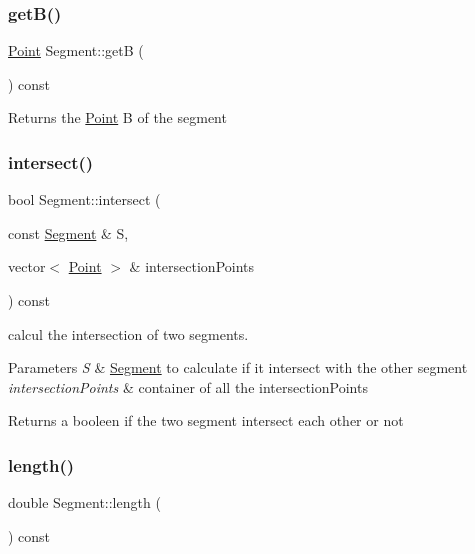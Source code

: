 \subsubsection{\texorpdfstring{get\+B()}{getB()}}
{\footnotesize\ttfamily \hyperlink{class_point}{Point} Segment\+::getB (\begin{DoxyParamCaption}{ }\end{DoxyParamCaption}) const}

\begin{DoxyReturn}{Returns}
the \hyperlink{class_point}{Point} B of the segment 
\end{DoxyReturn}
\hypertarget{class_segment_a379ebf65c2be2ce40d603ed33dae8843}{}\label{class_segment_a379ebf65c2be2ce40d603ed33dae8843} 
\subsubsection{\texorpdfstring{intersect()}{intersect()}}
{\footnotesize\ttfamily bool Segment\+::intersect (\begin{DoxyParamCaption}\item[{const \hyperlink{class_segment}{Segment} \&}]{S,  }\item[{vector$<$ \hyperlink{class_point}{Point} $>$ \&}]{intersection\+Points }\end{DoxyParamCaption}) const}



calcul the intersection of two segments. 


\begin{DoxyParams}{Parameters}
{\em S} & \hyperlink{class_segment}{Segment} to calculate if it intersect with the other segment \\
\hline
{\em intersection\+Points} & container of all the intersection\+Points \\
\hline
\end{DoxyParams}
\begin{DoxyReturn}{Returns}
a booleen if the two segment intersect each other or not 
\end{DoxyReturn}
\hypertarget{class_segment_a2821b168d6fdaba5cf63a89d8c3172f4}{}\label{class_segment_a2821b168d6fdaba5cf63a89d8c3172f4} 
\subsubsection{\texorpdfstring{length()}{length()}}
{\footnotesize\ttfamily double Segment\+::length (\begin{DoxyParamCaption}{ }\end{DoxyParamCaption}) const}

